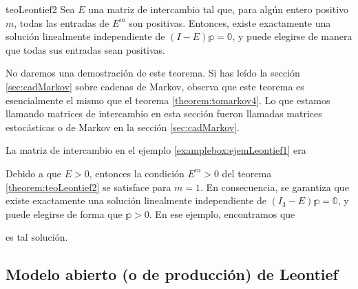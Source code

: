 \newpage

\begin{theorem}{}{teoLeontief2}
    Sea $E$ una matriz de intercambio tal que, para algún entero positivo $m$, todas las entradas de $E^m$ son positivas. Entonces, existe exactamente una solución linealmente independiente de $(I - E)\mathbb{p} = \mathbb{0}$, y puede elegirse de manera que todas sus entradas sean positivas.
\end{theorem}

No daremos una demostración de este teorema. Si has leído la sección \ref{sec:cadMarkov} sobre cadenas de Markov, observa que este teorema es esencialmente el mismo que el teorema \ref{theorem:tomarkov4}. Lo que estamos llamando matrices de intercambio en esta sección fueron llamadas matrices estocásticas o de Markov en la sección \ref{sec:cadMarkov}.

\begin{examplebox}{}{}
    La matriz de intercambio en el ejemplo \ref{examplebox:ejemLeontief1} era
    \begin{matrizn}
    \end{matrizn}
    Debido a que $E > 0$, entonces la condición $E^m > 0$ del teorema \ref{theorem:teoLeontief2} se satisface para $m = 1$. En consecuencia, se garantiza que existe exactamente una solución linealmente independiente de $(I_3 - E)\mathbb{p} = \mathbb{0}$, y puede elegirse de forma que $\mathbb{p} > 0$. En ese ejemplo, encontramos que
    \begin{matrizn}
    \end{matrizn}
    es tal solución.
\end{examplebox}

\subsection*{Modelo abierto (o de producción) de Leontief}

